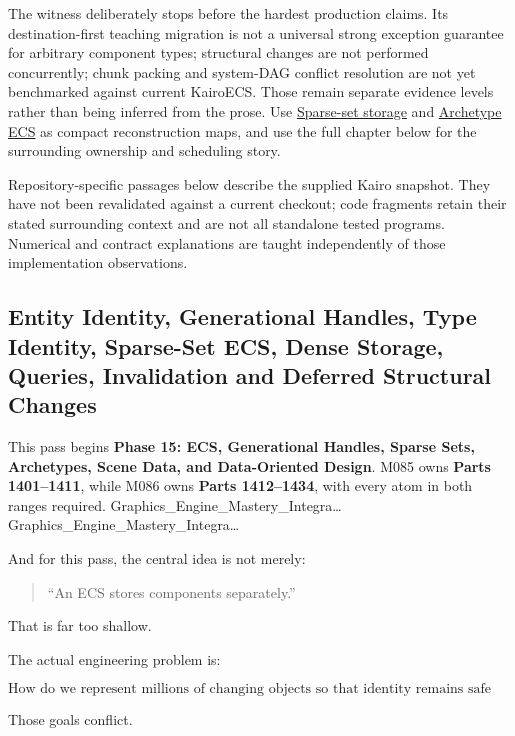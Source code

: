 The witness deliberately stops before the hardest production claims. Its destination-first teaching migration is not a universal strong exception guarantee for arbitrary component types; structural changes are not performed concurrently; chunk packing and system-DAG conflict resolution are not yet benchmarked against current KairoECS. Those remain separate evidence levels rather than being inferred from the prose. Use \hyperref[appendix-8404d0b1a3e7]{Sparse-set storage} and \hyperref[appendix-fbfeb0430008]{Archetype ECS} as compact reconstruction maps, and use the full chapter below for the surrounding ownership and scheduling story.

Repository-specific passages below describe the supplied Kairo snapshot. They have not been revalidated against a current checkout; code fragments retain their stated surrounding context and are not all standalone tested programs. Numerical and contract explanations are taught independently of those implementation observations.

\subsection{Entity Identity, Generational Handles, Type Identity, Sparse-Set ECS, Dense Storage, Queries, Invalidation and Deferred Structural Changes}\label{05-engine-i-ch014-entity-identity-generational-handles-type-identity-sparse-set-ecs-dense-storage-queries-invalidation-and-deferred-structural-changes}

This pass begins \textbf{Phase 15: ECS, Generational Handles, Sparse Sets, Archetypes, Scene Data, and Data-Oriented Design}. M085 owns \textbf{Parts 1401--1411}, while M086 owns \textbf{Parts 1412--1434}, with every atom in both ranges required. Graphics\_Engine\_Mastery\_Integra\ldots{} Graphics\_Engine\_Mastery\_Integra\ldots{}

And for this pass, the central idea is not merely:

\begin{quote}
``An ECS stores components separately.''
\end{quote}

That is far too shallow.

The actual engineering problem is:

\[
\boxed{
\text{How do we represent millions of changing objects so that identity remains safe while data remains compact, cache-friendly, queryable and mutable?}
}
\]

Those goals conflict.

